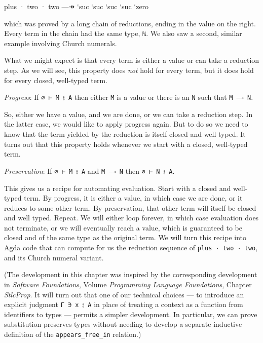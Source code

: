 \begin{myDisplay}
plus · two · two  —↠  `suc `suc `suc `suc `zero
\end{myDisplay}

which was proved by a long chain of reductions, ending in the value on
the right. Every term in the chain had the same type,
\texttt{\textasciigrave{}ℕ}. We also saw a second, similar example
involving Church numerals.

What we might expect is that every term is either a value or can take a
reduction step. As we will see, this property does \emph{not} hold for
every term, but it does hold for every closed, well-typed term.

\emph{Progress}: If \texttt{∅\ ⊢\ M\ ⦂\ A} then either \texttt{M} is a
value or there is an \texttt{N} such that \texttt{M\ —→\ N}.

So, either we have a value, and we are done, or we can take a reduction
step. In the latter case, we would like to apply progress again. But to
do so we need to know that the term yielded by the reduction is itself
closed and well typed. It turns out that this property holds whenever we
start with a closed, well-typed term.

\emph{Preservation}: If \texttt{∅\ ⊢\ M\ ⦂\ A} and \texttt{M\ —→\ N}
then \texttt{∅\ ⊢\ N\ ⦂\ A}.

This gives us a recipe for automating evaluation. Start with a closed
and well-typed term. By progress, it is either a value, in which case we
are done, or it reduces to some other term. By preservation, that other
term will itself be closed and well typed. Repeat. We will either loop
forever, in which case evaluation does not terminate, or we will
eventually reach a value, which is guaranteed to be closed and of the
same type as the original term. We will turn this recipe into Agda code
that can compute for us the reduction sequence of
\texttt{plus\ ·\ two\ ·\ two}, and its Church numeral variant.

(The development in this chapter was inspired by the corresponding
development in \emph{Software Foundations}, Volume \emph{Programming
Language Foundations}, Chapter \emph{StlcProp}. It will turn out that
one of our technical choices --- to introduce an explicit judgment
\texttt{Γ\ ∋\ x\ ⦂\ A} in place of treating a context as a function from
identifiers to types --- permits a simpler development. In particular,
we can prove substitution preserves types without needing to develop a
separate inductive definition of the \texttt{appears\_free\_in}
relation.)

